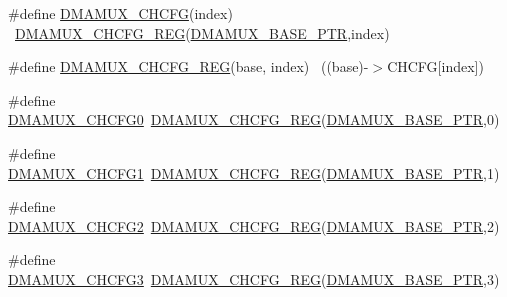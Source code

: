 \begin{DoxyCompactItemize}
\item 
\#define \hyperlink{group___d_m_a_m_u_x___register___accessor___macros_gaa8e0f6a3c125f7d5f98107dc0a3a4af1}{D\+M\+A\+M\+U\+X\+\_\+\+C\+H\+C\+FG}(index)                                        ~\hyperlink{group___d_m_a_m_u_x___register___accessor___macros_ga10cf09fe06ed04dc004b7b41da7cbf0d}{D\+M\+A\+M\+U\+X\+\_\+\+C\+H\+C\+F\+G\+\_\+\+R\+EG}(\hyperlink{group___d_m_a_m_u_x___peripheral_gad38c261e5de04658dbad762d40e8904e}{D\+M\+A\+M\+U\+X\+\_\+\+B\+A\+S\+E\+\_\+\+P\+TR},index)
\item 
\#define \hyperlink{group___d_m_a_m_u_x___register___accessor___macros_ga10cf09fe06ed04dc004b7b41da7cbf0d}{D\+M\+A\+M\+U\+X\+\_\+\+C\+H\+C\+F\+G\+\_\+\+R\+EG}(base,  index)                      ~((base)-\/$>$C\+H\+C\+FG\mbox{[}index\mbox{]})
\item 
\#define \hyperlink{group___d_m_a_m_u_x___register___accessor___macros_gaf1b9c5ddea4b98f2bbe2679878579c15}{D\+M\+A\+M\+U\+X\+\_\+\+C\+H\+C\+F\+G0}~\hyperlink{group___d_m_a_m_u_x___register___accessor___macros_ga10cf09fe06ed04dc004b7b41da7cbf0d}{D\+M\+A\+M\+U\+X\+\_\+\+C\+H\+C\+F\+G\+\_\+\+R\+EG}(\hyperlink{group___d_m_a_m_u_x___peripheral_gad38c261e5de04658dbad762d40e8904e}{D\+M\+A\+M\+U\+X\+\_\+\+B\+A\+S\+E\+\_\+\+P\+TR},0)
\item 
\#define \hyperlink{group___d_m_a_m_u_x___register___accessor___macros_gade1efccfbb28dfd338600665129d4b99}{D\+M\+A\+M\+U\+X\+\_\+\+C\+H\+C\+F\+G1}~\hyperlink{group___d_m_a_m_u_x___register___accessor___macros_ga10cf09fe06ed04dc004b7b41da7cbf0d}{D\+M\+A\+M\+U\+X\+\_\+\+C\+H\+C\+F\+G\+\_\+\+R\+EG}(\hyperlink{group___d_m_a_m_u_x___peripheral_gad38c261e5de04658dbad762d40e8904e}{D\+M\+A\+M\+U\+X\+\_\+\+B\+A\+S\+E\+\_\+\+P\+TR},1)
\item 
\#define \hyperlink{group___d_m_a_m_u_x___register___accessor___macros_ga1998089c67f104540eb435c07aced432}{D\+M\+A\+M\+U\+X\+\_\+\+C\+H\+C\+F\+G2}~\hyperlink{group___d_m_a_m_u_x___register___accessor___macros_ga10cf09fe06ed04dc004b7b41da7cbf0d}{D\+M\+A\+M\+U\+X\+\_\+\+C\+H\+C\+F\+G\+\_\+\+R\+EG}(\hyperlink{group___d_m_a_m_u_x___peripheral_gad38c261e5de04658dbad762d40e8904e}{D\+M\+A\+M\+U\+X\+\_\+\+B\+A\+S\+E\+\_\+\+P\+TR},2)
\item 
\#define \hyperlink{group___d_m_a_m_u_x___register___accessor___macros_gaf6786fc146f407e226ca14ccd1574be6}{D\+M\+A\+M\+U\+X\+\_\+\+C\+H\+C\+F\+G3}~\hyperlink{group___d_m_a_m_u_x___register___accessor___macros_ga10cf09fe06ed04dc004b7b41da7cbf0d}{D\+M\+A\+M\+U\+X\+\_\+\+C\+H\+C\+F\+G\+\_\+\+R\+EG}(\hyperlink{group___d_m_a_m_u_x___peripheral_gad38c261e5de04658dbad762d40e8904e}{D\+M\+A\+M\+U\+X\+\_\+\+B\+A\+S\+E\+\_\+\+P\+TR},3)

\end{DoxyCompactItemize}
